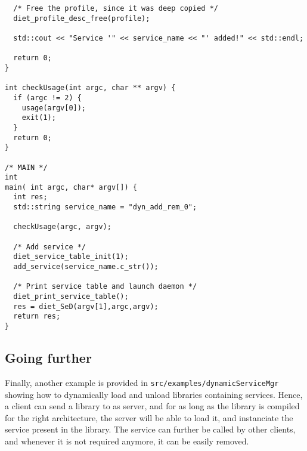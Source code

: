 {\begin{verbatim}
  /* Free the profile, since it was deep copied */
  diet_profile_desc_free(profile);

  std::cout << "Service '" << service_name << "' added!" << std::endl;

  return 0;
}

int checkUsage(int argc, char ** argv) {
  if (argc != 2) {
    usage(argv[0]);
    exit(1);
  }
  return 0;
}

/* MAIN */
int
main( int argc, char* argv[]) {
  int res;
  std::string service_name = "dyn_add_rem_0";

  checkUsage(argc, argv);

  /* Add service */
  diet_service_table_init(1);
  add_service(service_name.c_str());

  /* Print service table and launch daemon */
  diet_print_service_table();
  res = diet_SeD(argv[1],argc,argv);
  return res;
}
\end{verbatim}
}


\subsection{Going further}

Finally, another example is provided in
\texttt{src/examples/dynamicServiceMgr} showing how to dynamically
load and unload libraries containing services. Hence, a client can
send a library to as server, and for as long as the library is
compiled for the right architecture, the server will be able to load
it, and instanciate the service present in the library. The service
can further be called by other clients, and whenever it is not
required anymore, it can be easily removed.

